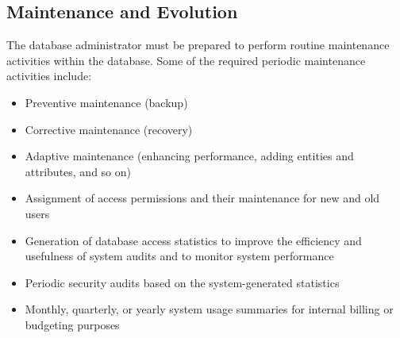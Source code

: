 \documentclass[a4paper, 12pt, titlepage]{report}
\begin{document}
\subsection{Maintenance and	Evolution}
The database administrator must be prepared to perform routine maintenance activities within the database. Some of the required periodic maintenance activities include:
\begin{itemize}
\item Preventive maintenance (backup)
\item Corrective maintenance (recovery)
\item Adaptive maintenance (enhancing performance, adding entities and attributes, and so on)
\item Assignment of access permissions and their maintenance for new and old users
\item Generation of database access statistics to improve the efficiency and usefulness of system audits and to monitor system performance
\item Periodic security audits based on the system-generated statistics
\item Monthly, quarterly, or yearly system usage summaries for internal billing or budgeting purposes
\end{itemize}
\end{document}
